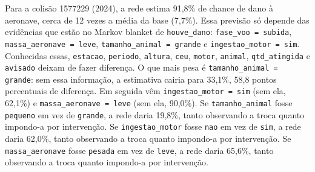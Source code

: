 Para a colisão 1577229 (2024), a rede estima 91,8\% de chance de dano à aeronave, cerca de 12 vezes a média da base (7,7\%). Essa previsão só depende das evidências que estão no Markov blanket de \texttt{houve\_dano}: \texttt{fase\_voo = subida}, \texttt{massa\_aeronave = leve}, \texttt{tamanho\_animal = grande} e \texttt{ingestao\_motor = sim}. Conhecidas essas, \texttt{estacao}, \texttt{periodo}, \texttt{altura}, \texttt{ceu}, \texttt{motor}, \texttt{animal}, \texttt{qtd\_atingida} e \texttt{avisado} deixam de fazer diferença. O que mais pesa é \texttt{tamanho\_animal = grande}: sem essa informação, a estimativa cairia para 33,1\%, 58,8 pontos percentuais de diferença. Em seguida vêm \texttt{ingestao\_motor = sim} (sem ela, 62,1\%) e \texttt{massa\_aeronave = leve} (sem ela, 90,0\%). Se \texttt{tamanho\_animal} fosse \texttt{pequeno} em vez de \texttt{grande}, a rede daria 19,8\%, tanto observando a troca quanto impondo-a por intervenção. Se \texttt{ingestao\_motor} fosse \texttt{nao} em vez de \texttt{sim}, a rede daria 62,0\%, tanto observando a troca quanto impondo-a por intervenção. Se \texttt{massa\_aeronave} fosse \texttt{pesada} em vez de \texttt{leve}, a rede daria 65,6\%, tanto observando a troca quanto impondo-a por intervenção.